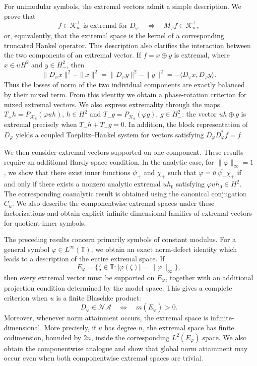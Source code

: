 \documentclass[12pt]{amsart}
\theoremstyle{definition}
\theoremstyle{remark}
\def \T{\mathbb{T}}
\newcommand{\clk}{\mathcal{K}}
\newcommand{\vp}{\varphi}
\numberwithin{equation}{section}
\begin{document}
For unimodular symbols, the extremal vectors admit a simple
description. We prove that
\[
f\in\clk_u^\perp \text{ is extremal for }D_\vp
\quad\Longleftrightarrow\quad
M_\vp f\in\clk_u^\perp,
\]
or, equivalently, that the extremal space is the kernel of a
corresponding truncated Hankel operator. This description also
clarifies the interaction between the two components of an extremal
vector. If $f=x\oplus y$ is extremal, where
$x\in uH^2$ and $y\in H^2_{-}$, then
\[
\|D_\vp x\|^2-\|x\|^2
= \|D_\vp y\|^2-\|y\|^2 =-\langle D_\vp x,D_\vp y\rangle.
\]
Thus the losses of norm of the two individual components are exactly
balanced by their mixed term. From this identity we obtain a
phase-rotation criterion for mixed extremal vectors. We also express
extremality through the maps
$T_{+}h=P_{\clk_u}(\vp uh),\, h\in H^2$ and
$T_{-}g=P_{\clk_u}(\vp g),\,g\in H^2_{-}$: the vector $uh\oplus g$ is extremal
precisely when $T_{+}h+T_{-}g=0$. In addition, the block representation
of $D_\vp$ yields a coupled Toeplitz--Hankel system for vectors
satisfying $D_\vp D_\vp^*f=f$.

We then consider extremal vectors supported on one component.
These results require an additional Hardy-space condition. In the
analytic case, for $\|\vp\|_\infty=1$, we show that there exist inner
functions $\psi_{+}$ and $\chi_+$ such that
$\vp=\bar{u}\,\overline{\psi_{+}}\chi_+$ if and only if there exists a
nonzero analytic extremal $uh_0$ satisfying
$\vp uh_0\in H^2$. The corresponding coanalytic result is obtained
using the canonical conjugation $C_u$. We also describe the
componentwise extremal spaces under these factorizations and obtain
explicit infinite-dimensional families of extremal vectors for
quotient-inner symbols.

The preceding results concern primarily symbols of constant modulus.
For a general symbol $\vp\in L^\infty(\T)$, we obtain an exact
norm-defect identity which leads to a description of the entire
extremal space. If
\[
E_\vp=\{\zeta\in\T:|\vp(\zeta)|=\|\vp\|_\infty\},
\]
then every extremal vector must be supported on $E_\vp$, together
with an additional projection condition determined by the model
space. This gives a complete criterion when $u$ is a finite Blaschke
product:
\[
D_\vp\in\mathcal{NA}
\quad\Longleftrightarrow\quad
m(E_\vp)>0.
\]
Moreover, whenever norm attainment occurs, the extremal space is
infinite-dimensional. More precisely, if $u$ has degree $n$, the
extremal space has finite codimension, bounded by $2n$, inside the
corresponding $L^2(E_\vp)$ space. We also obtain the componentwise
analogue and show that global norm attainment may occur even when
both componentwise extremal spaces are trivial.
\end{document}
